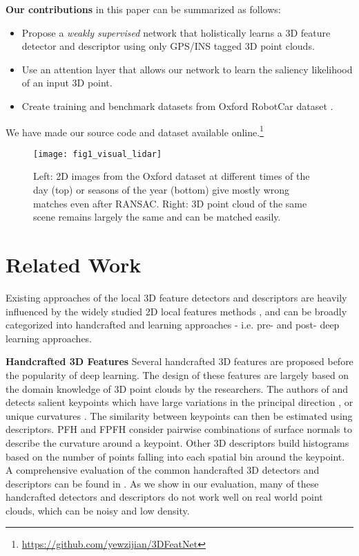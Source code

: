 \documentclass[runningheads]{llncs}
\begin{document}
\medskip
\noindent \textbf{Our contributions} in this paper can be summarized as follows:
\begin{itemize}
  \item Propose a \textit{weakly supervised} network that holistically learns a 3D feature detector and descriptor using only GPS/INS tagged 3D point clouds.
  \item Use an attention layer \cite{delf} that allows our network to learn the saliency likelihood of an input 3D point. 
  \item Create training and benchmark datasets from Oxford RobotCar dataset \cite{RobotCarDatasetIJRR}. 
\end{itemize}

\noindent We have made our source code and dataset available online.\footnote{\url{https://github.com/yewzijian/3DFeatNet}}

\begin{figure}[t]
\centering
\texttt{[image: fig1\_visual\_lidar]}
\caption{Left: 2D images from the Oxford dataset at different times of the day (top) or seasons of the year (bottom) give mostly wrong matches even after RANSAC. Right: 3D point cloud of the same scene remains largely the same and can be matched easily.}
\label{fig:visual-vs-lidar}
\end{figure}

\section{Related Work}
Existing approaches of the local 3D feature detectors and descriptors are heavily influenced by the widely studied 2D local features methods \cite{SIFT,SURF}, and can be broadly categorized into handcrafted \cite{ISS,LSP,PFH,FPFH,SpinImage,USC,SHOT} and learning approaches \cite{zeng20163dmatch,Elbaz2017CVPR,CGF,DescriptorSpecificDetector15,ppfnet} - i.e. pre- and post- deep learning approaches.

\medskip
\noindent \textbf{Handcrafted 3D Features} \enskip
Several handcrafted 3D features are proposed before the popularity of deep learning. The design of these features are largely based on the domain knowledge of 3D point clouds by the researchers.
The authors of \cite{ISS} and \cite{LSP} detects salient keypoints which have large variations in the principal direction \cite{ISS}, or unique curvatures \cite{LSP}. 
The similarity between keypoints can then be estimated using descriptors. PFH \cite{PFH} and FPFH \cite{FPFH} consider pairwise combinations of surface normals to describe the curvature around a keypoint. Other 3D descriptors \cite{SpinImage,USC} build histograms based on the number of points falling into each spatial bin around the keypoint. A comprehensive evaluation of the common handcrafted 3D detectors and descriptors can be found in \cite{HandcraftedComparison}. As we show in our evaluation, many of these handcrafted detectors and descriptors do not work well on real world point clouds, which can be noisy and low density.
\end{document}
